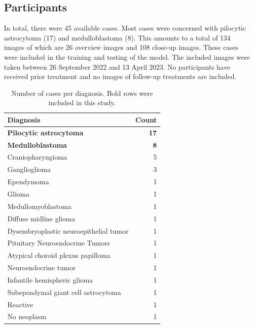 \subsection{Participants}
In total, there were 45 available cases.
Most cases were concerned with pilocytic astrocytoma (17) and medulloblastoma (8).
This amounts to a total of 134 images of which are 26 overview images and 108 close-up images.
These cases were included in the training and testing of the model.
The included images were taken between 26 September 2022 and 13 April 2023.
No participants have received prior treatment and no images of follow-up treatments are included.

\begin{table}
    \caption[Number of cases per diagnosis]{
        Number of cases per diagnosis.
        Bold rows were included in this study.
    }
    \label{tab:available_data}
    \begin{tabular}{lr}
        \toprule
        Diagnosis &  Count \\
        \midrule
        \textbf{Pilocytic astrocytoma}               &         \textbf{17} \\
        \textbf{Medulloblastoma}                     &          \textbf{8} \\
        Craniopharyngioma                   &          5 \\
        Ganglioglioma                       &          3 \\
        Ependymoma                          &          1 \\
        Glioma                              &          1 \\
        Medullomyoblastoma                  &          1 \\
        Diffuse midline glioma              &          1 \\
        Dysembryoplastic neuroepithelial tumor  &          1 \\
        Pituitary Neuroendocrine Tumors               &          1 \\
        Atypical choroid plexus papilloma   &          1 \\
        Neuroendocrine tumor                &          1 \\
        Infantile hemispheric glioma        &          1 \\
        Subependymal giant cell astrocytoma &          1 \\
        Reactive                            &          1 \\
        No neoplasm                         &          1 \\
        \bottomrule
    \end{tabular}
\end{table}

